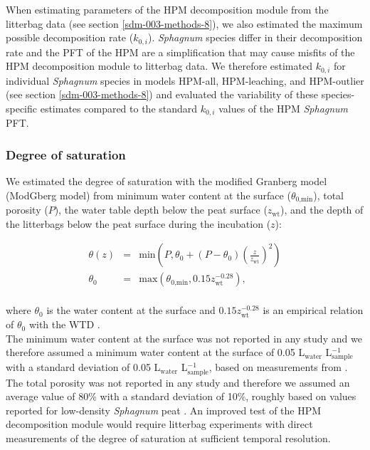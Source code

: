 \documentclass[esd, manuscript]{copernicus}
\begin{document}
When estimating parameters of the HPM decomposition module from the litterbag data (see section \ref{sdm-003-methods-8}), we also estimated the maximum possible decomposition rate (\(k_{0,i}\)). \emph{Sphagnum} species differ in their decomposition rate and the PFT of the HPM are a simplification that may cause misfits of the HPM decomposition module to litterbag data. We therefore estimated \(k_{0,i}\) for individual \emph{Sphagnum} species in models HPM-all, HPM-leaching, and HPM-outlier (see section \ref{sdm-003-methods-8}) and evaluated the variability of these species-specific estimates compared to the standard \(k_{0,i}\) values of the HPM \emph{Sphagnum} PFT.

\hypertarget{sdm-003-methods-5}{%
\subsubsection{Degree of saturation}\label{sdm-003-methods-5}}

We estimated the degree of saturation with the modified Granberg model (ModGberg model) \citep{Granberg.1999, Kettridge.2007} from minimum water content at the surface (\(\theta_\text{0,min}\)), total porosity (\(P\)), the water table depth below the peat surface (\(z_\text{wt}\)), and the depth of the litterbags below the peat surface during the incubation (\(z\)):

\begin{equation}
\begin{aligned}
\theta(z) & = & \text{min}\left( P, \theta_0 + (P - \theta_0) \left( \frac{z}{z_\text{wt}} \right)^2 \right)\\
\theta_0 & = & \text{max}\left(\theta_\text{0,min}, 0.15 z_\text{wt}^{-0.28}\right),\\
\end{aligned}
\label{eq:hpm-modified-granberg-1}
\end{equation}

where \(\theta_0\) is the water content at the surface and \(0.15 z_\text{wt}^{-0.28}\) is an empirical relation of \(\theta_0\) with the WTD \citep{Kettridge.2007}.\\
The minimum water content at the surface was not reported in any study and we therefore assumed a minimum water content at the surface of 0.05 L\(_\text{water}\) L\(^{-1}_\text{sample}\) with a standard deviation of 0.05 L\(_\text{water}\) L\(^{-1}_\text{sample}\), based on measurements from \citet{Hayward.1982}. The total porosity was not reported in any study and therefore we assumed an average value of 80\% with a standard deviation of 10\%, roughly based on values reported for low-density \emph{Sphagnum} peat \citep{Liu.2019}. An improved test of the HPM decomposition module would require litterbag experiments with direct measurements of the degree of saturation at sufficient temporal resolution.
\end{document}
